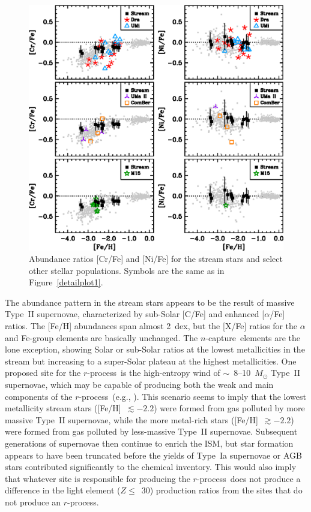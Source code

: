 \documentclass{emulateapj}
\def\rpro{\mbox{$r$-process}}
\def\ncap{\mbox{$n$-capture}}
\begin{document}
\begin{figure}
\includegraphics[angle=0,width=7.0in]{fig15.eps}
\caption{
\label{detailplot2}
Abundance ratios [Cr/Fe] and [Ni/Fe] for the stream stars and
select other stellar populations.
Symbols are the same as in Figure~\ref{detailplot1}.
}
\end{figure}


The abundance pattern in the stream stars appears to be the 
result of massive Type~II supernovae,
characterized by sub-Solar [C/Fe] and enhanced [$\alpha$/Fe] ratios.
The [Fe/H] abundances span almost 2~dex,
but the [X/Fe] ratios for the $\alpha$ and Fe-group elements
are basically unchanged.
The \ncap\ elements are the lone exception, showing Solar or sub-Solar
ratios at the lowest metallicities in the stream but increasing to
a super-Solar plateau at the highest metallicities.
One proposed site for the \rpro\ is the 
high-entropy wind of $\sim$~8--10~$M_{\odot}$ Type~II supernovae,
which may be capable of producing both the weak and main components
of the \rpro\ (e.g., \citealt{farouqi09}).
This scenario seems to imply that the lowest metallicity stream stars
([Fe/H]~$\lesssim -2.2$)
were formed from gas
polluted by more massive Type~II supernovae,
while the more metal-rich stars ([Fe/H]~$\gtrsim -2.2$)
were formed from gas polluted by 
less-massive Type~II supernovae.
Subsequent generations of supernovae then continue to enrich the
ISM, 
but star formation appears to have been truncated before the
yields of Type~Ia supernovae or AGB stars contributed significantly to the
chemical inventory.
This would also imply that whatever site is responsible
for producing the \rpro\ does not produce a 
difference in the light element ($Z \leq$~30) production ratios
from the sites that do not produce an \rpro.
\end{document}
